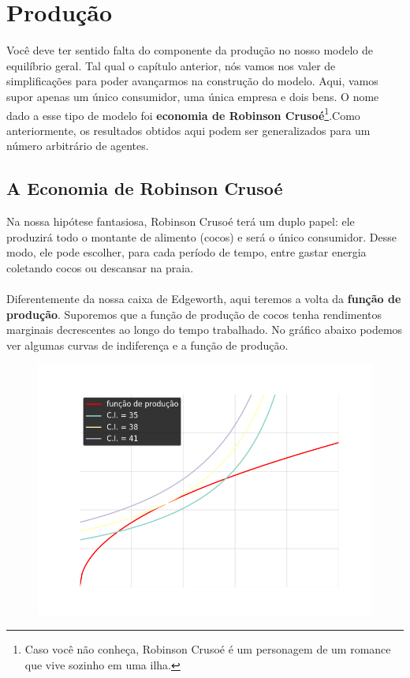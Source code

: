 \documentclass[a4paper,11pt,oneside]{book}
\theoremstyle{definition}
\theoremstyle{break}
\begin{document}
\chapter{Produção}

Você deve ter sentido falta do componente da produção no nosso modelo de equilíbrio geral. Tal qual o capítulo anterior, nós vamos nos valer de simplificações para poder avançarmos na construção do modelo. Aqui, vamos supor apenas um único consumidor, uma única empresa e dois bens. O nome dado a esse tipo de modelo foi \textbf{economia de Robinson Crusoé}\footnote{Caso você não conheça, Robinson Crusoé é um personagem de um romance que vive sozinho em uma ilha.}.Como anteriormente, os resultados obtidos aqui podem ser generalizados para um número arbitrário de agentes.

\section{A Economia de Robinson Crusoé}

Na nossa hipótese fantasiosa, Robinson Crusoé terá um duplo papel: ele produzirá todo o montante de alimento (cocos) e será o único consumidor. Desse modo, ele pode escolher, para cada período de tempo, entre gastar energia coletando cocos ou descansar na praia.
\\
\\
Diferentemente da nossa caixa de Edgeworth, aqui teremos a volta da \textbf{função de produção}. Suporemos que a função de produção de cocos tenha rendimentos marginais decrescentes ao longo do tempo trabalhado. No gráfico abaixo podemos ver algumas curvas de indiferença e a função de produção.

\begin{figure}[H]
	\centering
	\includegraphics[scale=0.6]{cap33_1-economia_robinson.png}
\end{figure}
\end{document}
